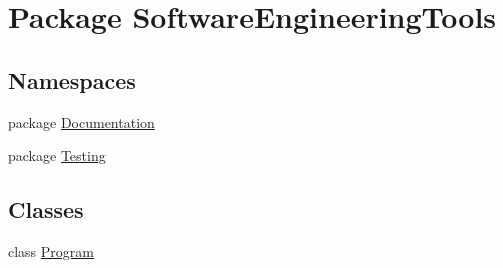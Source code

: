 \hypertarget{namespace_software_engineering_tools}{\section{Package Software\+Engineering\+Tools}
\label{namespace_software_engineering_tools}
}
\subsection*{Namespaces}
\begin{DoxyCompactItemize}
\item 
package \hyperlink{namespace_software_engineering_tools_1_1_documentation}{Documentation}
\item 
package \hyperlink{namespace_software_engineering_tools_1_1_testing}{Testing}
\end{DoxyCompactItemize}
\subsection*{Classes}
\begin{DoxyCompactItemize}
\item 
class \hyperlink{class_software_engineering_tools_1_1_program}{Program}
\end{DoxyCompactItemize}
